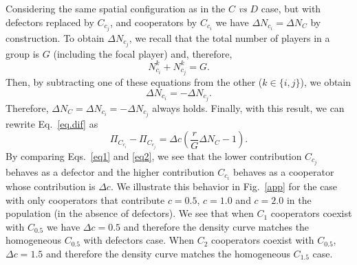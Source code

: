 \documentclass[twocolumn,aps,amsmath,pre,floatfix,superscriptaddress]{revtex4-2}
\begin{document}
Considering the same spatial configuration as in the $C$ \textit{vs} $D$ case, 
 but with defectors replaced by  $C_{c_j}$, and  cooperators by $C_{c_i}$ 
we  have  $\Delta N_{c_i} = \Delta N_{C}$ by construction. 
%
To obtain $\Delta N_{c_j}$, we recall that the total number of players in a group is $G$ (including the focal player) and, therefore, 
\begin{equation}
    N_{c_i}^{k} + N_{c_j}^{k} = G. 
\end{equation}
 Then, by subtracting one of these equations from the other ($k\in\{i,j\}$), we  obtain 
\begin{equation}
      \Delta N_{c_i} = -  \Delta N_{c_j}.
\end{equation}
%
Therefore, 
 $ \Delta N_{C} =  \Delta N_{c_i} = -  \Delta N_{c_j}$ always holds.  Finally, with this result, we can rewrite Eq.~\ref{eq.dif} as
\begin{equation}
     \Pi_{C_{c_i}} -  \Pi_{C_{c_j}} = \Delta c \left( \frac{r}{G} \Delta N_{C} - 1 \right). \label{eq2}
\end{equation}
By comparing Eqs.~\ref{eq1} and \ref{eq2}, we see that the lower contribution $C_{c_j}$ behaves as a defector and the higher contribution $C_{c_i}$ behaves as a cooperator whose contribution is $\Delta c$.  
%
We illustrate this behavior in Fig.~\ref{app} for the case with only cooperators that contribute $c=0.5$, $c=1.0$ and $c=2.0$ in the population (in the absence of defectors).
%
We see that when $C_{1}$ cooperators coexist with $C_{0.5}$ we have $\Delta c = 0.5$ and therefore the density curve matches the homogeneous $C_{0.5}$ with defectors case. When $C_{2}$ cooperators coexist with $C_{0.5}$, $\Delta c = 1.5$ and therefore the density curve matches the homogeneous $C_{1.5}$ case.
\end{document}
